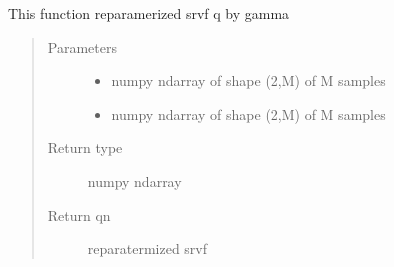 \documentclass[letterpaper,10pt,english]{sphinxmanual}
\begin{document}

\begin{fulllineitems}
\label{\detokenize{curve_functions:curve_functions.group_action_by_gamma}}
This function reparamerized srvf q by gamma
\begin{quote}\begin{description}
\item[{Parameters}] \leavevmode\begin{itemize}
\item {} 
 \textendash{} numpy ndarray of shape (2,M) of M samples

\item {} 
 \textendash{} numpy ndarray of shape (2,M) of M samples

\end{itemize}

\item[{Return type}] \leavevmode
numpy ndarray

\item[{Return qn}] \leavevmode
reparatermized srvf

\end{description}\end{quote}

\end{fulllineitems}

\end{document}
